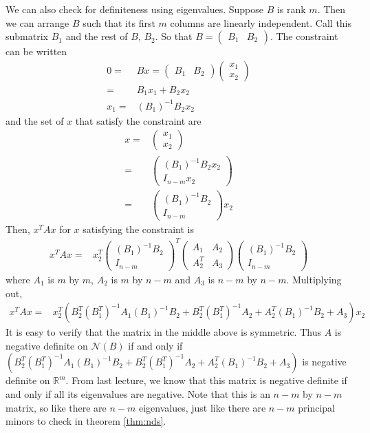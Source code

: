 \documentclass[12pt,reqno]{amsart}
\theoremstyle{definition}
\def\R{\mathbb{R}}
\begin{document}
We can also check for definiteness using eigenvalues. Suppose $B$ is
rank $m$. Then we can arrange $B$ such that its first $m$ columns are
linearly independent. Call this submatrix $B_1$ and the rest of $B$,
$B_2$. So that $B = \begin{pmatrix} B_1 & B_2 \end{pmatrix}$. The
constraint can be written
\begin{align*}
  0 = & B x = \begin{pmatrix} B_1 & B_2 \end{pmatrix} \begin{pmatrix}
    x_1 \\ x_2 \end{pmatrix} \\
  = & B_1 x_1 + B_2 x_2 \\
  x_1 = & (B_1)^{-1} B_2 x_2
\end{align*}
and the set of $x$ that satisfy the constraint are
\begin{align*} x = & \begin{pmatrix} x_1 \\ x_2 \end{pmatrix} \\
  = & \begin{pmatrix}
    (B_1)^{-1} B_2 x_2 \\ I_{n-m} x_2 \end{pmatrix} \\
  = & \begin{pmatrix}
    (B_1)^{-1} B_2 \\ I_{n-m} \end{pmatrix} x_2
\end{align*}
Then, $x^T A x$ for $x$ satisfying the constraint is
\begin{align*}
  x^T A x = & x_2^T \begin{pmatrix}
    (B_1)^{-1} B_2 \\ I_{n-m} \end{pmatrix}^T \begin{pmatrix} A_1 & A_2
    \\ A_2^T & A_3 \end{pmatrix} \begin{pmatrix}
    (B_1)^{-1} B_2 \\ I_{n-m} \end{pmatrix}
\end{align*}
where $A_1$ is $m$ by $m$, $A_2$ is $m$ by $n-m$ and $A_3$ is $n-m$ by
$n-m$. Multiplying out,
\begin{align*}
  x^T A x = & x_2^T \left( B_2^T (B_1^T)^{-1} A_1 (B_1)^{-1} B_2 +
    B_2^T (B_1^T)^{-1} A_2 +  A_2^T (B_1)^{-1} B_2 + A_3\right) x_2
\end{align*}
It is easy to verify that the matrix in the middle above is
symmetric. Thus $A$ is negative definite on $\mathcal{N}(B)$ if and
only if $\left(B_2^T (B_1^T)^{-1} A_1 (B_1)^{-1} B_2 +
  B_2^T (B_1^T)^{-1} A_2 +  A_2^T (B_1)^{-1} B_2 + A_3\right)$ is
negative definite on $\R^m$. From last lecture, we know that this
matrix is negative definite if and only if all its eigenvalues are
negative. Note that this is an $n-m$ by $n-m$ matrix, so like there
are $n-m$ eigenvalues, just like there are $n-m$ principal minors to
check in theorem \ref{thm:nds}. 
\end{document}
